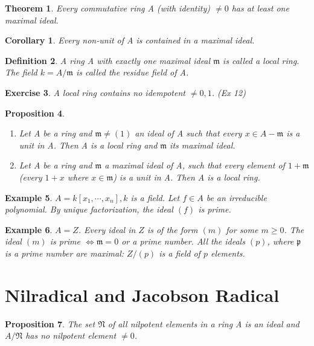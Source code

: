 \documentclass[]{report}
\newtheorem{theorem}{Theorem}[section]
\newtheorem{prop}[theorem]{Proposition}
\newtheorem{corollary}{Corollary}[theorem]
\newtheorem{defn}[theorem]{Definition}
\newtheorem{examples}[theorem]{Example}
\newtheorem{exercise}[theorem]{Exercise}
\begin{document}
\begin{theorem}
    Every commutative ring A (with identity) $\neq 0$ has at least one maximal ideal.
\end{theorem}

\begin{corollary}
    Every non-unit of A is contained in a maximal ideal.
\end{corollary}

\begin{defn}
    A ring A with exactly one maximal ideal $\mathfrak{m}$ is called a local ring. The field $k=A/\mathfrak{m}$ is called the residue field of A.
\end{defn}

\begin{exercise}
    A local ring contains no idempotent $\neq 0,1$. (Ex 12)
\end{exercise}

\begin{prop}
    \begin{enumerate}
        \item Let A be a ring and $\mathfrak{m} \neq (1)$ an ideal of A such that every $x\in A-\mathfrak{m}$ is a unit in A. Then A is a local ring and $\mathfrak{m}$ its maximal ideal. 
        \item Let A be a ring and $\mathfrak{m}$ a maximal ideal of A, such that every element of $\mathfrak{1+m}$ (every $1+x$ where $x\in \mathfrak{m}$) is a unit in A. Then A is a local ring.
    \end{enumerate}
\end{prop}

\begin{examples}
     $A = k[x_1, \cdots, x_n], k$ is a field. Let $f\in A$ be an irreducible polynomial. By unique factorization, the ideal $(f)$ is prime. 
 \end{examples}
 \begin{examples}
 $A = Z$. Every ideal in $Z$ is of the form $(m)$ for some $m\geq 0$. The ideal $(m)$ is prime $\Leftrightarrow \mathfrak{m} = 0$ or a prime number. All the ideals $(p)$, where $\mathfrak{p}$ is a prime number are maximal: $Z/(p)$ is a field of $p$ elements.
\end{examples}

\section{Nilradical and Jacobson Radical}

\begin{prop}
    The set $\mathfrak{N}$ of all nilpotent elements in a ring A is an ideal and $A/\mathfrak{N}$ has no nilpotent element $\neq 0$.
\end{prop}
\end{document}
